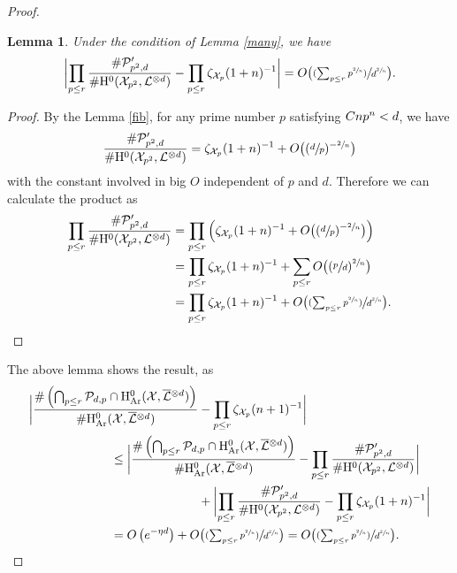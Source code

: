 \documentclass[JEP,XML,SOM,Unicode,published]{cedram}
\newcommand{\psfrac}[2]{\sfrac{(#1)}{#2}}
\theoremstyle{plain}
\newtheorem{lem}[thm]{Lemma}
\theoremstyle{definition}
\newcommand{\ho}{\mathrm{H}}
\newcommand{\X}{\mathcal{X}}
\newcommand{\li}{\mathcal{L}}
\begin{document}
\begin{proof}
\begin{lem}\label{manymany}
Under the condition of Lemma \ref{many}, we have
\[
\biggl| \prod_{p\leq r} \frac{\#\mathcal{P}'_{p^2,d}}{\#\ho^0(\X_{p^2}, \li^{\otimes d})} - \prod_{p\leq r} \zeta_{\X_p}(1+n)^{-1} \biggr| =O\bigl(\psfrac{\textstyle\sum_{p\leq r}p^{\sfrac{2}{n}}}{d^{\sfrac{2}{n}}} \bigr).
\]
\end{lem}
\begin{proof}
By the Lemma \ref{fib}, for any prime number $p$ satisfying $Cnp^n<\nobreak d$, we have
\[
\frac{\#\mathcal{P}'_{p^2,d}}{\#\ho^0(\X_{p^2}, \li^{\otimes d})}=\zeta_{\X_p}(1+n)^{-1} + O\bigl((\sfrac{d}{p})^{-\sfrac{2}{n}} \bigr)
\]
with the constant involved in big $O$ independent of $p$ and $d$. Therefore we can calculate the product as
\begin{align*}
\prod_{p\leq r} \frac{\#\mathcal{P}'_{p^2,d}}{\#\ho^0(\X_{p^2}, \li^{\otimes d})} &= \prod_{p\leq r} \left(\zeta_{\X_p}(1+n)^{-1} + O\bigl((\sfrac{d}{p})^{-\sfrac{2}{n}} \bigr) \right) \\
&= \prod_{p\leq r} \zeta_{\X_p}(1+n)^{-1} +\sum_{p\leq r} O\bigl((\sfrac{p}{d})^{\sfrac{2}{n}} \bigr) \\
&= \prod_{p\leq r} \zeta_{\X_p}(1+n)^{-1} + O\bigl(\psfrac{\textstyle\sum_{p\leq r} p^{\sfrac{2}{n}}}{d^{\sfrac{2}{n}}} \bigr).\qedhere
\end{align*}
\end{proof}
The above lemma shows the result, as
\begin{align*}
\biggl| \frac{\#\left(\bigcap_{p\leq r}\mathcal{P}_{d,p}\cap \ho^0_{\mathrm{Ar}}(\X, \overline{\mathcal{L}}{}^{\otimes d})\right)}{\#\ho^0_{\mathrm{Ar}}(\X, \overline{\mathcal{L}}{}^{\otimes d})} &-\prod_{p\leq r}\zeta_{\X_p}(n+1)^{-1} \biggr| \\
&\hspace*{-2.5cm}\leq \biggl| \frac{\#\left(\bigcap_{p\leq r}\mathcal{P}_{d,p}\cap \ho^0_{\mathrm{Ar}}(\X, \overline{\mathcal{L}}{}^{\otimes d})\right)}{\#\ho^0_{\mathrm{Ar}}(\X, \overline{\mathcal{L}}{}^{\otimes d})} -\prod_{p\leq r} \frac{\#\mathcal{P}'_{p^2,d}}{\#\ho^0(\X_{p^2}, \li^{\otimes d})} \biggr| \\
& +\biggl| \prod_{p\leq r} \frac{\#\mathcal{P}'_{p^2,d}}{\#\ho^0(\X_{p^2}, \li^{\otimes d})} - \prod_{p\leq r} \zeta_{\X_p}(1+n)^{-1} \biggr| \\
&\hspace*{-2.5cm}=O\left(e^{-\eta d} \right)+O\bigl(\psfrac{\textstyle\sum_{p\leq r} p^{\sfrac{2}{n}}}{d^{\sfrac{2}{n}}} \bigr)=O\bigl(\psfrac{\textstyle\sum_{p\leq r} p^{\sfrac{2}{n}}}{d^{\sfrac{2}{n}}} \bigr).\qedhere
\end{align*}
\end{proof}
\end{document}
